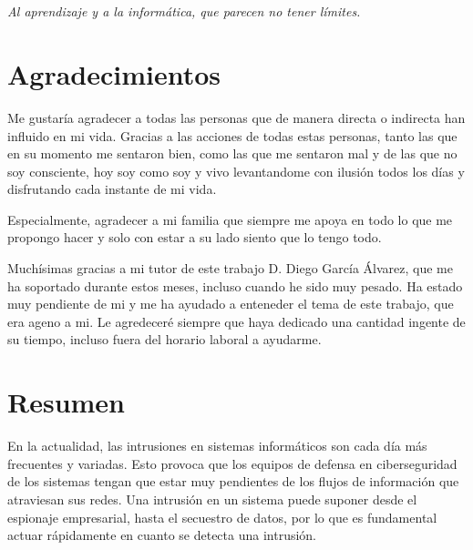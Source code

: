 \documentclass[openright,twoside,10pt]{book}
\begin{document}
\chapter*{}
\begin{flushright}
\textit{%
Al aprendizaje y a la informática, que parecen no tener límites.}
\end{flushright}

\chapter*{Agradecimientos} %

Me gustaría agradecer a todas las personas que de manera directa o indirecta han influido en mi vida. Gracias a las acciones de todas estas personas, tanto las que en su momento me sentaron bien, como las que me sentaron mal y de las que no soy consciente, hoy soy como soy y vivo levantandome con ilusión todos los días y disfrutando cada instante de mi vida.

Especialmente, agradecer a mi familia que siempre me apoya en todo lo que me propongo hacer y solo con estar a su lado siento que lo tengo todo.

Muchísimas gracias a mi tutor de este trabajo D. Diego García Álvarez, que me ha soportado durante estos meses, incluso cuando he sido muy pesado. Ha estado muy pendiente de mi y me ha ayudado a enteneder el tema de este trabajo, que era ageno a mi. Le agredeceré siempre que haya dedicado una cantidad ingente de su tiempo, incluso fuera del horario laboral a ayudarme.


\chapter*{Resumen} %

En la actualidad, las intrusiones en sistemas informáticos son cada día más frecuentes y variadas. Esto provoca que los equipos de defensa en ciberseguridad de los sistemas tengan que estar muy pendientes de los flujos de información que atraviesan sus redes. Una intrusión en un sistema puede suponer desde el espionaje empresarial, hasta el secuestro de datos, por lo que es fundamental actuar rápidamente en cuanto se detecta una intrusión.
\end{document}
